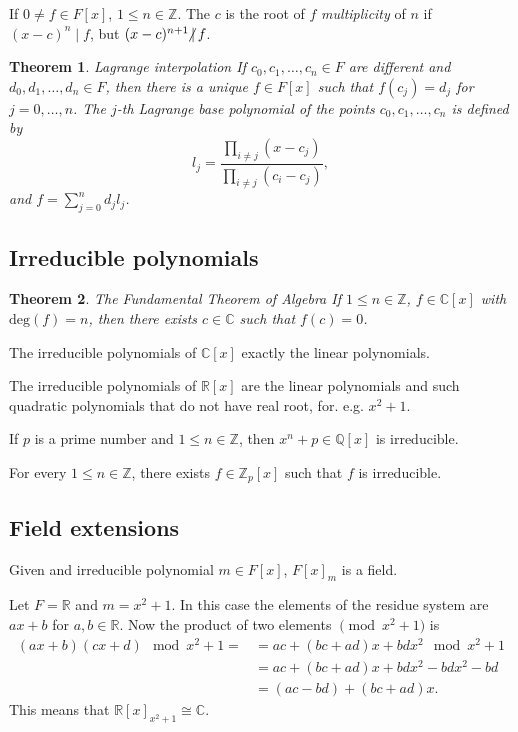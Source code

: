 \documentclass{article}
\newcommand{\Z}{\mathbb{Z}}
\newcommand{\nmid}{\hspace{-4pt}\not|\hspace{2pt}}
\newtheorem{theorem}{Theorem}
\begin{document}
If $0 \neq f \in F[x]$, $1 \le n \in \Z$. The $c$ is the root of $f$ \emph{multiplicity} of $n$ if $(x-c)^n \mid f$, but $(x-c)^{n+1} \nmid f$.

\begin{theorem}{Lagrange interpolation}
    If $c_0,c_1,\ldots,c_n \in F$ are different and $d_0,d_1,\ldots,d_n \in F$, then there is a unique $f\in F[x]$ such that $f(c_j) = d_j$ for $j=0,\ldots,n$.
    The $j$-th Lagrange base polynomial of the points $c_0,c_1,\ldots,c_n$ is defined by
    \[
        l_j = \frac{\prod_{i \neq j} (x - c_j)}{\prod_{i \neq j} (c_i - c_j)},
    \]
    and $f = \sum_{j=0}^n d_j l_j$.
\end{theorem}

\subsection{Irreducible polynomials}

\begin{theorem}{The Fundamental Theorem of Algebra}
    If $1 \le n \in \Z$, $f \in \mathbb{C}[x]$ with $\mathrm{deg}(f) = n$, then there exists $c\in\mathbb{C}$ such that $f(c) = 0$.
\end{theorem}

The irreducible polynomials of $\mathbb{C}[x]$ exactly the linear polynomials.

The irreducible polynomials of $\mathbb{R}[x]$ are the linear polynomials and such quadratic polynomials that do not have real root, for. e.g. $x^2 + 1$.

If $p$ is a prime number and $1 \le n \in \Z$, then $x^n + p \in \mathbb{Q}[x]$ is irreducible.

For every $1 \le n \in \Z$, there exists $f \in \Z_p[x]$ such that $f$ is irreducible.

\subsection{Field extensions}

Given and irreducible polynomial $m \in F[x]$, $F[x]_m$ is a field.

Let $F=\mathbb{R}$ and $m = x^2 + 1$. In this case the elements of the residue system are $ax+b$ for $a,b \in \mathbb{R}$.
Now the product of two elements $\pmod{x^2 + 1}$ is
\begin{align*}
    (ax + b)(cx + d) \mod x^2 + 1 = &= ac + (bc+ad)x + bdx^2 \mod x^2 + 1 \\
                                    &= ac + (bc+ad)x + bdx^2 - bdx^2 - bd \\
                                    &= (ac - bd) + (bc + ad)x.
\end{align*}
This means that $\mathbb{R}[x]_{x^2 + 1} \cong \mathbb{C}$.
\end{document}
